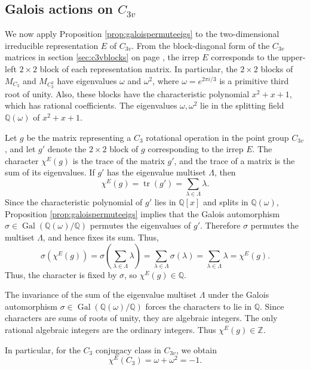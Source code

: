 \documentclass{article}
\DeclareMathOperator{\Gal}{Gal}
\DeclareMathOperator{\tr}{tr}
\begin{document}
    \subsection{Galois actions on \texorpdfstring{$C_{3v}$}{C3v}}

    We now apply Proposition \ref{prop:galoispermuteeigs} to the two-dimensional irreducible representation $E$ of $C_{3v}$. From the block-diagonal form of the $C_{3v}$ matrices in section \ref{sec:c3vblocks} on page \pageref{sec:c3vblocks}, the irrep $E$ corresponds to the upper-left $2\times 2$ block of each representation matrix. In particular, the $2\times2$ blocks of $M_{C_3}$ and $M_{C_3^2}$ have eigenvalues $\omega$ and $\omega^2$, where $\omega=e^{2\pi i/3}$ is a primitive third root of unity. Also, these blocks have the characteristic polynomial $x^2+x+1$, which has rational coefficients. The eigenvalues $\omega,\omega^2$ lie in the splitting field $\mathbb{Q}(\omega)$ of $x^2+x+1$.

    Let $g$ be the matrix representing a $C_3$ rotational operation in the point group $C_{3v}$, and let $g'$ denote the $2\times2$ block of $g$ corresponding to the irrep $E$. The character $\chi^E(g)$ is the trace of the matrix $g'$, and the trace of a matrix is the sum of its eigenvalues. If $g'$ has the eigenvalue multiset $\Lambda$, then \[\chi^E(g)=\tr(g')=\sum_{\lambda\in\Lambda}\lambda.\] Since the characteristic polynomial of $g'$ lies in $\mathbb{Q}[x]$ and splits in $\mathbb{Q}(\omega)$, Proposition \ref{prop:galoispermuteeigs} implies that the Galois automorphism $\sigma\in\Gal(\mathbb{Q}(\omega)/\mathbb{Q})$ permutes the eigenvalues of $g'$. Therefore $\sigma$ permutes the multiset $\Lambda$, and hence fixes its sum. Thus,
    \[
        \sigma(\chi^E(g))=\sigma\left(\sum_{\lambda\in\Lambda}\lambda\right)=\sum_{\lambda\in\Lambda}\sigma(\lambda)=\sum_{\lambda\in\Lambda}\lambda=\chi^E(g).
    \]
    Thus, the character is fixed by $\sigma$, so $\chi^E(g)\in\mathbb{Q}$.
    
    The invariance of the sum of the eigenvalue multiset $\Lambda$ under the Galois automorphism $\sigma\in\Gal(\mathbb{Q}(\omega)/\mathbb{Q})$ forces the characters to lie in $\mathbb{Q}$. Since characters are sums of roots of unity, they are algebraic integers. The only rational algebraic integers are the ordinary integers. Thus $\chi^E(g)\in\mathbb{Z}$. \cite{roche}

    In particular, for the $C_3$ conjugacy class in $C_{3v}$, we obtain
    \[\chi^E(C_3)=\omega+\omega^2=-1.\]
\end{document}
